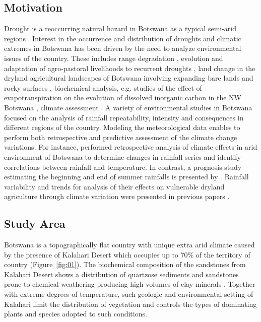 \documentclass[ijgi,article,submit,pdftex,moreauthors]{Definitions/mdpi}
\begin{document}
\subsection{Motivation}

Drought is a reoccurring natural hazard in Botswana as a typical semi-arid regions \cite{Batisani2011}. Interest in the occurrence and distribution of droughts and climatic extremes in Botswana has been driven by the need to analyze environmental issues of the country. These includes range degradation \cite{Vanderpost}, evolution and adaptation of agro-pastoral livelihoods to recurrent droughts \cite{Mogotsi}, land change in the dryland agricultural landscapes of Botswana involving expanding bare lands and rocky surfaces \cite{Akinyemi}, biochemical analysis, e.g. studies of the effect of evapotranspiration on the evolution of dissolved inorganic carbon in the NW Botswana \cite{Atekwana}, climate assessment \cite{Ringrose2002}. A variety of environmental studies in Botswana focused on the analysis of rainfall repeatability, intensity and consequences in different regions of the country. Modeling the meteorological data enables to perform both retrospective and predictive assessment of the climate change variations. For instance, \cite{Kenabatho} performed retrospective analysis of climate effects in arid environment of Botswana to determine changes in rainfall series and identify correlations between rainfall and temperature. In contrast, a prognosis study estimating the beginning and end of summer rainfalls is presented by \cite{Byakatonda2019}. Rainfall variability and trends for analysis of their effects on vulnerable dryland agriculture through climate variation were presented in previous papers \cite{Batisani}.

\subsection{Study Area}
Botswana is a topographically flat country with unique extra arid climate caused by the presence of Kalahari Desert which occupies up to 70\% of the territory of country (Figure~\ref{fig:01}). The biochemical composition of the sandstones from Kalahari Desert shows a distribution of quartzose sediments and sandstones prone to chemical weathering producing high volumes of clay minerals \cite{Franchi}. Together with extreme degrees of temperature, such geologic and environmental setting of Kalahari limit the distribution of vegetation and controls the types of dominating plants and species adopted to such conditions. 
\end{document}
